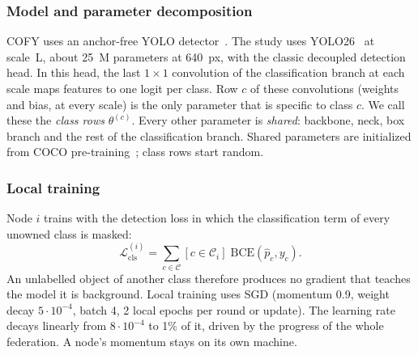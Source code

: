\documentclass[pdflatex,sn-mathphys-num]{sn-jnl}
\newcommand{\sys}{COFY}
\begin{document}
\subsubsection{Model and parameter decomposition}
\sys{} uses an anchor-free YOLO detector~\cite{redmon2016yolo,ultralytics}. The study uses YOLO26~\cite{jocher2026yolo26} at scale~L, about 25~M parameters at 640~px, with the classic decoupled detection head. In this head, the last $1\times1$ convolution of the classification branch at each scale maps features to one logit per class. Row $c$ of these convolutions (weights and bias, at every scale) is the only parameter that is specific to class $c$. We call these the \emph{class rows} $\theta^{(c)}$. Every other parameter is \emph{shared}: backbone, neck, box branch and the rest of the classification branch. Shared parameters are initialized from COCO pre-training~\cite{lin2014coco}; class rows start random.

\subsubsection{Local training}
Node $i$ trains with the detection loss in which the classification term of every unowned class is masked:
\begin{equation}
\mathcal{L}^{(i)}_{\text{cls}}=\sum_{c\in\mathcal{C}}[c\in\mathcal{C}_i]\;\mathrm{BCE}(\hat p_c,y_c).
\end{equation}
An unlabelled object of another class therefore produces no gradient that teaches the model it is background. Local training uses SGD (momentum 0.9, weight decay $5\cdot10^{-4}$, batch 4, 2 local epochs per round or update). The learning rate decays linearly from $8\cdot10^{-4}$ to 1\% of it, driven by the progress of the whole federation. A node's momentum stays on its own machine.
\end{document}
